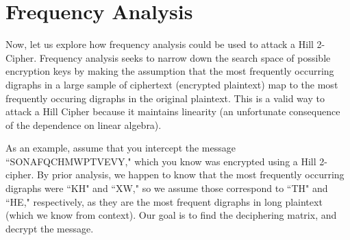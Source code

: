 \documentclass{article}
\begin{document}
\section{Frequency Analysis}
Now, let us explore how frequency analysis could be used to attack a Hill 2-Cipher. Frequency analysis seeks to narrow down the search space of possible encryption keys by making the assumption that the most frequently occurring digraphs in a large sample of ciphertext (encrypted plaintext) map to the most frequently occuring digraphs in the original plaintext. This is a valid way to attack a Hill Cipher because it maintains linearity (an unfortunate consequence of the dependence on linear algebra). \medskip

\noindent As an example, assume that you intercept the message ``SONAFQCHMWPTVEVY," which you know was encrypted using a Hill 2-cipher. By prior analysis, we happen to know that the most frequently occurring digraphs were ``KH" and ``XW," so we assume those correspond to ``TH" and ``HE," respectively, as they are the most frequent digraphs in long plaintext (which we know from context). Our goal is to find the deciphering matrix, and decrypt the message. \medskip
\end{document}
